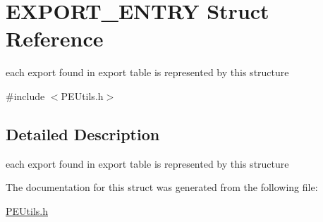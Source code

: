 \hypertarget{struct_e_x_p_o_r_t___e_n_t_r_y}{}\section{E\+X\+P\+O\+R\+T\+\_\+\+E\+N\+T\+RY Struct Reference}
\label{struct_e_x_p_o_r_t___e_n_t_r_y}


each export found in export table is represented by this structure  




{\ttfamily \#include $<$P\+E\+Utils.\+h$>$}



\subsection{Detailed Description}
each export found in export table is represented by this structure 

The documentation for this struct was generated from the following file\+:\begin{DoxyCompactItemize}
\item 
\mbox{\hyperlink{_p_e_utils_8h}{P\+E\+Utils.\+h}}\end{DoxyCompactItemize}
